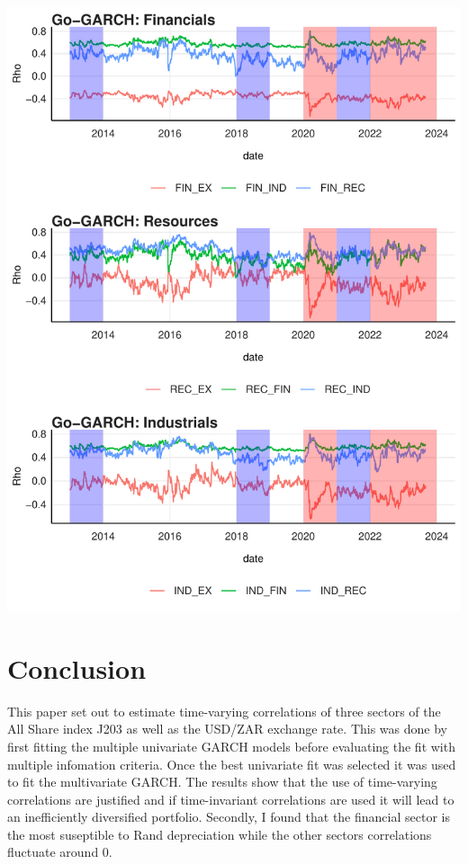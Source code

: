 \documentclass[12pt,preprint, authoryear]{elsarticle}
\let\origfigure\figure
\let\endorigfigure\endfigure
\renewenvironment{figure}[1][2] {
    \expandafter\origfigure\expandafter[H]
} {
    \endorigfigure
}
\numberwithin{equation}{section}
\numberwithin{figure}{section}
\numberwithin{table}{section}
\begin{document}
\begin{figure}[H]

{\centering \includegraphics{WriteUp_files/figure-latex/Figure4-1} 

}

\caption{GO-GARCH  \label{Figure4}}\label{fig:Figure4}
\end{figure}

\hypertarget{conclusion}{%
\section{Conclusion}\label{conclusion}}

This paper set out to estimate time-varying correlations of three
sectors of the All Share index J203 as well as the USD/ZAR exchange
rate. This was done by first fitting the multiple univariate GARCH
models before evaluating the fit with multiple infomation criteria. Once
the best univariate fit was selected it was used to fit the multivariate
GARCH. The results show that the use of time-varying correlations are
justified and if time-invariant correlations are used it will lead to an
inefficiently diversified portfolio. Secondly, I found that the
financial sector is the most suseptible to Rand depreciation while the
other sectors correlations fluctuate around 0.
\end{document}

